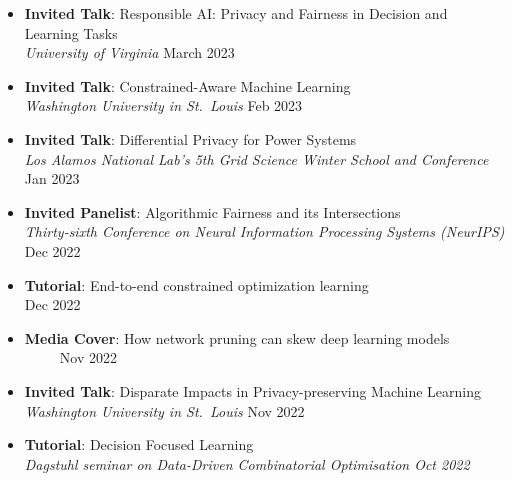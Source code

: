 \begin{itemize}
  \item {\bf Invited Talk}: {Responsible AI: Privacy and Fairness in Decision and Learning Tasks}\\
  {\em  University of Virginia}
  \hfill{March 2023}

  \item {\bf Invited Talk}: {Constrained-Aware Machine Learning}\\
  {\em  Washington University in St.~Louis}
  \hfill{Feb 2023}

  \item {\bf Invited Talk}: {Differential Privacy for Power Systems}\\
  {\em  Los Alamos National Lab's 5th Grid Science Winter School and Conference}
  \hfill{Jan 2023}

  \item {\bf Invited Panelist}: {Algorithmic Fairness and its Intersections}\\
  {\em Thirty-sixth Conference on Neural Information Processing Systems (NeurIPS)}
  \hfill{Dec 2022}

  \item {\bf Tutorial}: {End-to-end constrained optimization learning}\\
  \hfill{Dec 2022}

  \item {\bf Media Cover}: 
  {How network pruning can skew deep learning models}\\ 
  ~
  ~
  ~
  \hfill {Nov 2022}

  \item {\bf Invited Talk}: {Disparate Impacts in Privacy-preserving Machine Learning}\\
  {\em Washington University in St.~Louis} \hfill{Nov 2022}

  \item {\bf Tutorial}: {Decision Focused Learning}\\
  \em{Dagstuhl seminar on Data-Driven Combinatorial Optimisation}
  \hfill{Oct 2022}


\end{itemize}

